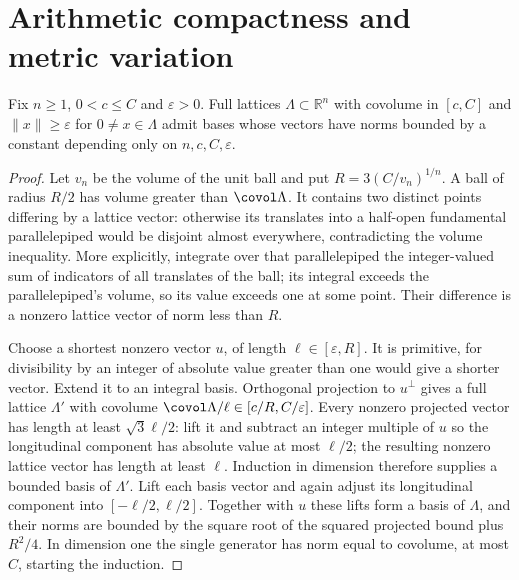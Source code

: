 \chapter{Arithmetic compactness and metric variation}

\begin{lemma}
\label{lem:bounded-lattice-bases}
\leanok
{}
Fix $n\geq1$, $0<c\leq C$ and $\varepsilon>0$. Full lattices
$\Lambda\subset\mathbb R^n$ with covolume in $[c,C]$ and
$\|x\|\geq\varepsilon$ for $0\ne x\in\Lambda$ admit bases whose
vectors have norms bounded by a constant depending only on
$n,c,C,\varepsilon$.
\end{lemma}
\begin{proof}
Let $v_n$ be the volume of the unit ball and put
$R=3(C/v_n)^{1/n}$. A ball of radius $R/2$ has volume greater than
$\covol\Lambda$. It contains two distinct points differing by a lattice
vector: otherwise its translates into a half-open fundamental
parallelepiped would be disjoint almost everywhere, contradicting the
volume inequality. More explicitly, integrate over that parallelepiped
the integer-valued sum of indicators of all translates of the ball;
its integral exceeds the parallelepiped's volume, so its value exceeds
one at some point. Their difference is a nonzero lattice vector of norm
less than $R$.

Choose a shortest nonzero vector $u$, of length $\ell\in[\varepsilon,R]$.
It is primitive, for divisibility by an integer of absolute value greater
than one would give a shorter vector. Extend it to an integral basis.
Orthogonal projection to $u^\perp$ gives a full lattice $\Lambda'$
with covolume $\covol\Lambda/\ell\in[c/R,C/\varepsilon]$.
Every nonzero projected vector has length at least
$\sqrt3\ell/2$: lift it and subtract an integer multiple of $u$ so
the longitudinal component has absolute value at most $\ell/2$;
the resulting nonzero lattice vector has length at least $\ell$.
Induction in dimension therefore supplies a bounded basis of
$\Lambda'$. Lift each basis vector and again adjust its longitudinal
component into $[-\ell/2,\ell/2]$. Together with $u$ these lifts form
a basis of $\Lambda$, and their norms are bounded by the square root
of the squared projected bound plus $R^2/4$. In dimension one the
single generator has norm equal to covolume, at most $C$, starting
the induction.
\end{proof}

